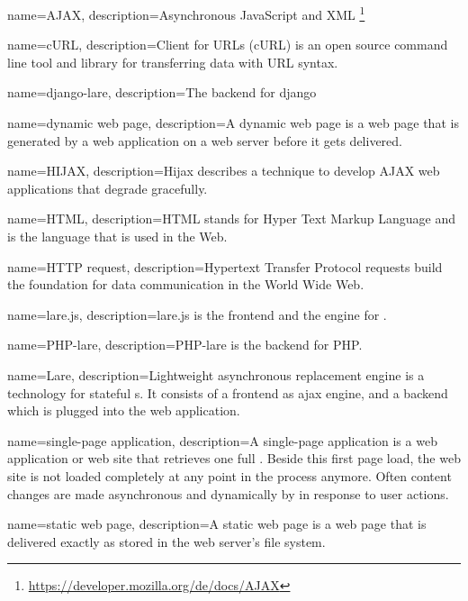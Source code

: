 \usepackage{glossaries}

{
  name=AJAX,
  description={Asynchronous JavaScript and XML \footnote{\url{https://developer.mozilla.org/de/docs/AJAX}}}
}

{
  name=cURL,
  description={Client for URLs (cURL) is an open source command line tool and library for transferring data with URL syntax.}
}

{
  name=django-lare,
  description={The \lare{} backend for django}
}

{
  name=dynamic web page,  
  description={A dynamic web page is a web page that is generated by a web application on a web server before it gets delivered.}
}

{
  name=HIJAX,
  description={Hijax describes a technique to develop AJAX web applications that degrade gracefully.}
}

{
  name=HTML,
  description={HTML stands for Hyper Text Markup Language and is the language that is used in the Web.}
}

{
  name=HTTP request,
  description={Hypertext Transfer Protocol requests build the foundation for data communication in the World Wide Web.}
}

{
  name=lare.js,
  description={lare.js is the \lare{} frontend and the \ajax{} engine for \lare{}.}
}

{
  name=PHP-lare,
  description={PHP-lare is the \lare{} backend for PHP.}
}

{
  name=Lare,
  description={Lightweight asynchronous replacement engine is a technology for stateful \singlePageApplication{}s.
  It consists of a \lare{} frontend as ajax engine, and a \lare{} backend which is plugged into the web application.}
}

{
  name=single-page application,
  description={A single-page application is a web application or web site that retrieves one full \webPage{}.
  Beside this first page load, the web site is not loaded completely at any point in the process anymore.
  Often content changes are made asynchronous and dynamically by \ajax{} in response to user actions.}
}

{
  name=static web page,
  description={A static web page is a web page that is delivered exactly as stored in the web server's file system.}
}

